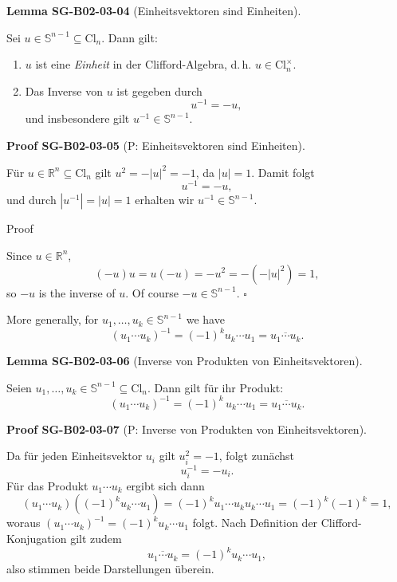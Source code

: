 \documentclass[10pt, letterpaper]{article}
\newcommand{\R}{\mathbb{R}}
\newcommand{\Cl}{\mathrm{Cl}}
\newcommand{\CustomHeading}[3]{%
  \par\medskip\noindent%
  \textbf{#1 #2} \textnormal{(#3)}.\enskip%
}
\newenvironment{LEM}[2]{\begin{unitbox}\CustomHeading{Lemma}{#1}{#2}}{\end{unitbox}}
\newenvironment{PROOF}[2]{\begin{unitbox}\CustomHeading{Proof}{#1}{#2}}{\end{unitbox}}
\begin{document}
\begin{LEM}{SG-B02-03-04}{Einheitsvektoren sind Einheiten}
Sei \(u \in \mathbb{S}^{n-1} \subseteq \Cl_n\). Dann gilt:
\begin{enumerate}[label=(\roman*)]
\item \(u\) ist eine \emph{Einheit} in der Clifford-Algebra, d.\,h.
      \(u \in \Cl_n^{\times}\).
\item Das Inverse von \(u\) ist gegeben durch
      \[
      u^{-1} = -u,
      \]
      und insbesondere gilt \(u^{-1} \in \mathbb{S}^{n-1}\).
\end{enumerate}
\end{LEM}


\begin{PROOF}{SG-B02-03-05}{P: Einheitsvektoren sind Einheiten}
Für \(u \in \R^n \subseteq \Cl_n\) gilt \(u^2 = -|u|^2 = -1\),
da \(|u| = 1\). Damit folgt
\[
u^{-1} = -u,
\]
und durch \(|u^{-1}| = |u| = 1\) erhalten wir \(u^{-1} \in \mathbb{S}^{n-1}\).
\end{PROOF}



Proof


Since $u \in \mathbb{R}^{n}$,
$$
(-u) u=u(-u)=-u^{2}=-\left(-|u|^{2}\right)=1,
$$
so $-u$ is the inverse of $u$. Of course $-u \in \mathbb{S}^{n-1}$. \(\square\)



More generally, for $u_{1}, \ldots, u_{k} \in \mathbb{S}^{n-1}$ we have
$$
\left(u_{1} \cdots u_{k}\right)^{-1}=(-1)^{k} u_{k} \cdots u_{1}=\overline{u_{1} \cdots u_{k}} .
$$


\begin{LEM}{SG-B02-03-06}{Inverse von Produkten von Einheitsvektoren}
Seien \(u_{1}, \ldots, u_{k} \in \mathbb{S}^{n-1} \subseteq \Cl_n\).
Dann gilt für ihr Produkt:
\[
\left(u_{1} \cdots u_{k}\right)^{-1}
= (-1)^{k}\, u_{k} \cdots u_{1}
= \overline{u_{1} \cdots u_{k}} .
\]
\end{LEM}



\begin{PROOF}{SG-B02-03-07}{P: Inverse von Produkten von Einheitsvektoren}
Da für jeden Einheitsvektor \(u_i\) gilt \(u_i^2 = -1\), folgt zunächst
\[
u_i^{-1} = -u_i.
\]
Für das Produkt \(u_1 \cdots u_k\) ergibt sich dann
\[
\left(u_{1} \cdots u_{k}\right)\left((-1)^{k} u_{k} \cdots u_{1}\right)
= (-1)^{k} u_{1} \cdots u_{k} u_{k} \cdots u_{1}
= (-1)^{k} (-1)^{k} = 1,
\]
woraus \(\left(u_{1} \cdots u_{k}\right)^{-1} = (-1)^{k} u_{k} \cdots u_{1}\) folgt.
Nach Definition der Clifford-Konjugation gilt zudem
\[
\overline{u_{1} \cdots u_{k}} = (-1)^{k} u_{k} \cdots u_{1},
\]
also stimmen beide Darstellungen überein.
\end{PROOF}
\end{document}
